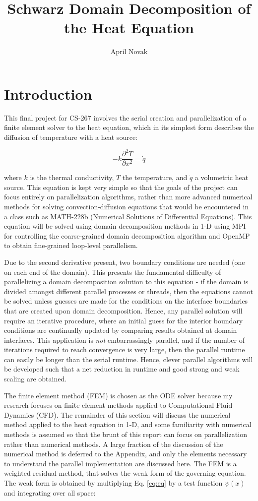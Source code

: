 \documentclass[10pt]{article}
\title{Schwarz Domain Decomposition of the Heat Equation}
\author{April Novak}
\newcommand{\beq}{\begin{equation}}
\newcommand{\eeq}{\end{equation}}
\begin{document}
\maketitle

\section{Introduction}

This final project for CS-267 involves the serial creation and parallelization of a finite element solver to the heat equation, which in its simplest form describes the diffusion of temperature with a heat source:

\beq
\label{eq:eq}
-k\frac{\partial^2 T}{\partial x^2}=\dot{q}
\eeq

where \(k\) is the thermal conductivity, \(T\) the temperature, and \(\dot{q}\) a volumetric heat source. This equation is kept very simple so that the goals of the project can focus entirely on parallelization algorithms, rather than more advanced numerical methods for solving convection-diffusion equations that would be encountered in a class such as MATH-228b (Numerical Solutions of Differential Equations). This equation will be solved using domain decomposition methods in 1-D using MPI for controlling the coarse-grained domain decomposition algorithm and OpenMP to obtain fine-grained loop-level parallelism.

Due to the second derivative present, two boundary conditions are needed (one on each end of the domain). This presents the fundamental difficulty of parallelizing a domain decomposition  solution to this equation - if the domain is divided amongst different parallel processes or threads, then the equations cannot be solved unless guesses are made for the conditions on the interface boundaries that are created upon domain decomposition. Hence, any parallel solution will require an iterative procedure, where an initial guess for the interior boundary conditions are continually updated by comparing results obtained at domain interfaces. This application is \textit{not} embarrassingly parallel, and if the number of iterations required to reach convergence is very large, then the parallel runtime can easily be longer than the serial runtime. Hence, clever parallel algorithms will be developed such that a net reduction in runtime and good strong and weak scaling are obtained.

The finite element method (FEM) is chosen as the ODE solver because my research focuses on finite element methods applied to Computational Fluid Dynamics (CFD). The remainder of this section will discuss the numerical method applied to the heat equation in 1-D, and some familiarity with numerical methods is assumed so that the brunt of this report can focus on parallelization rather than numerical methods. A large fraction of the discussion of the numerical method is deferred to the Appendix, and only the elements necessary to understand the parallel implementation are discussed here. The FEM is a weighted residual method, that solves the weak form of the governing equation. The weak form is obtained by multiplying Eq. \eqref{eq:eq} by a test function \(\psi(x)\) and integrating over all space:
\end{document}
